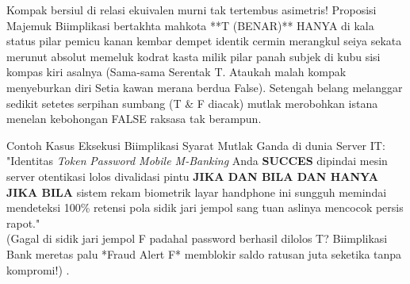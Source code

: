 \begin{definisi}
Kompak bersiul di relasi ekuivalen murni tak tertembus asimetris! Proposisi Majemuk Biimplikasi bertakhta mahkota **T (BENAR)** HANYA di kala status pilar pemicu kanan kembar dempet identik cermin merangkul seiya sekata merunut absolut memeluk kodrat kasta milik pilar panah subjek di kubu sisi kompas kiri asalnya (Sama-sama Serentak T. Ataukah malah kompak menyeburkan diri Setia kawan merana berdua False). Setengah belang melanggar sedikit setetes serpihan sumbang (T \& F diacak) mutlak merobohkan istana menelan kebohongan FALSE raksasa tak berampun.
\end{definisi}

Contoh Kasus Eksekusi Biimplikasi Syarat Mutlak Ganda di dunia Server IT: \\
"Identitas \textit{Token} \textit{Password Mobile M-Banking} Anda \textbf{SUCCES} dipindai mesin server otentikasi lolos divalidasi pintu \textbf{JIKA DAN BILA DAN HANYA JIKA BILA} sistem rekam biometrik layar handphone ini sungguh memindai mendeteksi 100\% retensi pola sidik jari jempol sang tuan aslinya mencocok persis rapot." \\
(Gagal di sidik jari jempol F padahal password berhasil dilolos T? Biimplikasi Bank meretas palu *Fraud Alert F* memblokir saldo ratusan juta seketika tanpa kompromi!) \cite{wiki_first_order_logic}.
